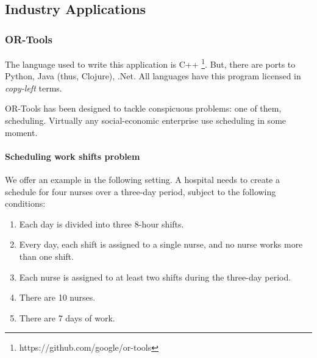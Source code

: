 \documentclass[
12pt,				%
openright,			%
oneside,			%
a4paper,			%
brazil,				%
english,			  %
]{abntex2}
\begin{document}
\subsection{Industry Applications}

\subsubsection{OR-Tools}
The language used to write this application is C++ \footnote{https://github.com/google/or-tools}. But,
there are ports to Python, Java (thus, Clojure), .Net. All languages
have this program licensed in \textit{copy-left} terms.

OR-Tools has been designed to tackle conspicuous problems: one of them,
scheduling. Virtually any social-economic enterprise use scheduling in
some moment.

\paragraph{Scheduling work shifts problem}
We offer an example in the following setting. A hospital needs to create a schedule for four nurses over a three-day period, subject to the following conditions:

\begin{enumerate}
\item Each day is divided into three 8-hour shifts.
\item Every day, each shift is assigned to a single nurse, and no
  nurse works more than one shift.
\item Each nurse is assigned to at least two shifts during the
  three-day period.
\item There are 10 nurses.
\item There are 7 days of work.
\end{enumerate}
\end{document}
